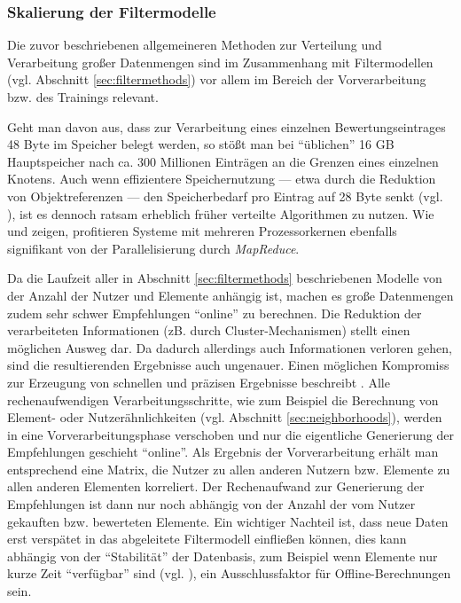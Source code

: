 \subsubsection{Skalierung der Filtermodelle}\label{sec:scalefiltering}

Die zuvor beschriebenen allgemeineren Methoden zur Verteilung und Verarbeitung großer Datenmengen sind im Zusammenhang mit Filtermodellen (vgl. Abschnitt \ref{sec:filtermethods}) vor allem im Bereich der Vorverarbeitung bzw. des Trainings relevant. 

Geht man davon aus, dass zur Verarbeitung eines einzelnen Bewertungseintrages 48 Byte im Speicher belegt werden, so stößt man bei ``üblichen'' 16 GB Hauptspeicher nach ca. 300 Millionen Einträgen an die Grenzen eines einzelnen Knotens. Auch wenn effizientere Speichernutzung --- etwa durch die Reduktion von Objektreferenzen --- den Speicherbedarf pro Eintrag auf 28 Byte senkt (vgl. \citep{mia}), ist es dennoch ratsam erheblich früher verteilte Algorithmen zu nutzen. Wie \citep{mapred06} und \citep{jiang11} zeigen, profitieren Systeme mit mehreren Prozessorkernen ebenfalls signifikant von der Parallelisierung durch \textit{MapReduce}.

Da die Laufzeit aller in Abschnitt \ref{sec:filtermethods} beschriebenen Modelle von der Anzahl der Nutzer und Elemente anhängig ist, machen es große Datenmengen zudem sehr schwer Empfehlungen ``online'' zu berechnen. Die Reduktion der verarbeiteten Informationen (zB. durch Cluster-Mechanismen) stellt einen möglichen Ausweg dar. Da dadurch allerdings auch Informationen verloren gehen, sind die resultierenden Ergebnisse auch ungenauer. Einen möglichen Kompromiss zur Erzeugung von schnellen und präzisen Ergebnisse beschreibt \citep{linden03}. Alle rechenaufwendigen Verarbeitungsschritte, wie zum Beispiel die Berechnung von Element- oder Nutzerähnlichkeiten (vgl. Abschnitt \ref{sec:neighborhoods}), werden in eine Vorverarbeitungsphase verschoben und nur die eigentliche Generierung der Empfehlungen geschieht ``online''. Als Ergebnis der Vorverarbeitung erhält man entsprechend eine Matrix, die Nutzer zu allen anderen Nutzern bzw. Elemente zu allen anderen Elementen korreliert. Der Rechenaufwand zur Generierung der Empfehlungen ist dann nur noch abhängig von der Anzahl der vom Nutzer gekauften bzw. bewerteten Elemente. Ein wichtiger Nachteil ist, dass neue Daten erst verspätet in das abgeleitete Filtermodell einfließen können, dies kann abhängig von der ``Stabilität'' der Datenbasis, zum Beispiel wenn Elemente nur kurze Zeit ``verfügbar'' sind (vgl. \citep{Cornelis20074906}), ein Ausschlussfaktor für Offline-Berechnungen sein. \citep{linden03}


